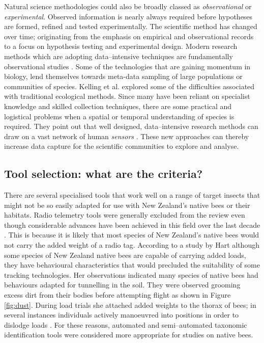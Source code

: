 Natural science methodologies could also be broadly classed as \emph{observational} or \emph{experimental}. Observed information is nearly always required {before} hypotheses are formed, refined and tested experimentally. The scientific method has changed over time; originating from the emphasis on empirical and observational records to a focus on hypothesis testing and experimental design. Modern research methods which are adopting  data--intensive techniques are fundamentally observational studies \cite{Kelling2009}.
Some of the technologies that are gaining momentum in biology, lend themselves towards meta-data sampling of large populations or communities of species. Kelling et al.\cite{Kelling2009} explored some of the difficulties associated with traditional ecological methods. Since many have been reliant on specialist knowledge and skilled collection techniques, there are some practical and logistical problems when a spatial or temporal understanding of species is required. They point out that well designed, data--intensive research methods can draw on a vast network of human \emph{sensors} \cite{Vitolo2015}. These new approaches can thereby increase data capture for the scientific communities to explore and analyse.

\subsection{Tool selection: what are the criteria?}\label{sec:tool-selection:-what-are-the-criteria?}
There are several specialised tools that work well on a range of target insects that  might not be so easily adapted for use with New Zealand's native bees or their habitats.
Radio telemetry tools \cite{Mascanzoni1986,Lovei1997} were generally excluded from the review even though considerable advances have been achieved in this field over the last decade \cite{Osborne1999,Colpitts2004,Oneil2004}. This is because it is likely that most species of New Zealand's native bees would not carry the added weight of a radio tag. According to a study by Hart \cite{Hart2007} although some species of New Zealand native bees are capable of carrying added loads, they have behavioural characteristics that would precluded the suitability of some tracking technologies. Her observations indicated many species of native bees had behaviours adapted for tunnelling in the soil. They were observed grooming excess dirt from their bodies before attempting flight as shown in Figure \ref{fig:dust}. During load trials she attached added weights to the thorax of bees; in several instances individuals actively manoeuvred into positions in order to dislodge loads \cite[pg. 78]{Hart2007}. For these reasons, automated and semi--automated taxonomic identification tools were considered more appropriate for studies on native bees.

